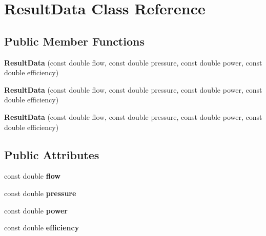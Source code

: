 \hypertarget{class_result_data}{}\section{Result\+Data Class Reference}
\label{class_result_data}
\subsection*{Public Member Functions}
\begin{DoxyCompactItemize}
\item 
\mbox{\label{class_result_data_ab10ba8e317d8b9d830c5f90debfbb15b}} 
{\bfseries Result\+Data} (const double flow, const double pressure, const double power, const double efficiency)
\item 
\mbox{\label{class_result_data_ab10ba8e317d8b9d830c5f90debfbb15b}} 
{\bfseries Result\+Data} (const double flow, const double pressure, const double power, const double efficiency)
\item 
\mbox{\label{class_result_data_ab10ba8e317d8b9d830c5f90debfbb15b}} 
{\bfseries Result\+Data} (const double flow, const double pressure, const double power, const double efficiency)
\end{DoxyCompactItemize}
\subsection*{Public Attributes}
\begin{DoxyCompactItemize}
\item 
\mbox{\label{class_result_data_ae8459ee960a807938dfe6eaa265531cc}} 
const double {\bfseries flow}
\item 
\mbox{\label{class_result_data_a496cd3f0c80f254fcf2ebd7f3476e6dd}} 
const double {\bfseries pressure}
\item 
\mbox{\label{class_result_data_a990344826f779c300db9e3128f160c1e}} 
const double {\bfseries power}
\item 
\mbox{\label{class_result_data_a1b75ddc30c8470877bc93bfa6ccafa0e}} 
const double {\bfseries efficiency}
\end{DoxyCompactItemize}


